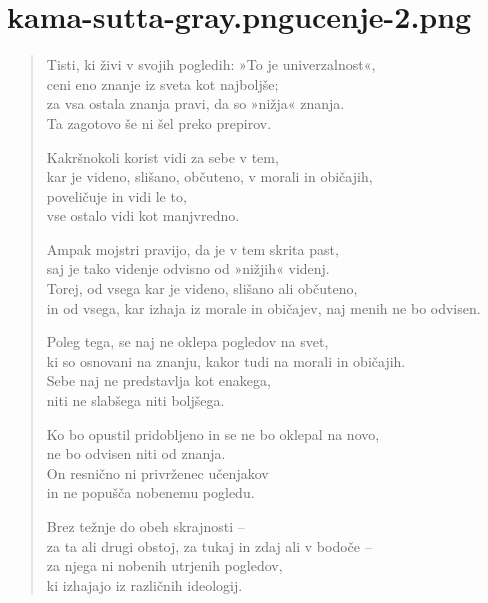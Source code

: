 
\chapter[Paramaṭṭhaka Sutta]{{kama-sutta-gray.png}{ucenje-2.png}}


\begin{verse}


Tisti, ki živi v svojih pogledih: »To je univerzalnost«,\\
ceni eno znanje iz sveta kot najboljše;\\
za vsa ostala znanja pravi, da so »nižja« znanja.\\
Ta zagotovo še ni šel preko prepirov.

Kakršnokoli korist vidi za sebe v tem,\\
kar je videno, slišano, občuteno, v morali in običajih,\\
poveličuje in vidi le to,\\
vse ostalo vidi kot manjvredno.

Ampak mojstri pravijo, da je v tem skrita past,\\
saj je tako videnje odvisno od »nižjih« videnj.\\
Torej, od vsega kar je videno, slišano ali občuteno,\\
in od vsega, kar izhaja iz morale in običajev, naj menih ne bo odvisen.

Poleg tega, se naj ne oklepa pogledov na svet,\\
ki so osnovani na znanju, kakor tudi na morali in običajih.\\
Sebe naj ne predstavlja kot enakega,\\
niti ne slabšega niti boljšega.

Ko bo opustil pridobljeno in se ne bo oklepal na novo,\\
ne bo odvisen niti od znanja.\\
On resnično ni privrženec učenjakov\\
in ne popušča nobenemu pogledu.

Brez težnje do obeh skrajnosti --\\
za ta ali drugi obstoj, za tukaj in zdaj ali v bodoče --\\
za njega ni nobenih utrjenih pogledov,\\
ki izhajajo iz različnih ideologij.


\end{verse}
